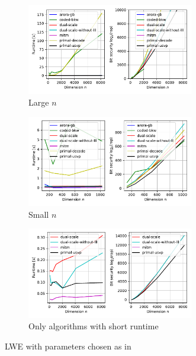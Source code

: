 \begin{figure}[h!]
    \centering
    \begin{subfigure}{1\textwidth}
        \centering
        \includegraphics[width=0.8\textwidth]{graphics/LWE_plot_Regev_long.pdf}
        \caption{Large $n$}
    \end{subfigure}
    \begin{subfigure}{1\textwidth}
        \centering
        \includegraphics[width=0.8\textwidth]{graphics/LWE_plot_Regev_long_small_n.pdf}
        \caption{Small $n$}
    \end{subfigure}
    \begin{subfigure}{1\textwidth}
        \centering
        \includegraphics[width=0.8\textwidth]{graphics/LWE_plot_Regev_short.pdf}
        \caption{Only algorithms with short runtime}
    \end{subfigure}
    \caption{LWE with parameters chosen as in \cite{Reg05}}\label{fig:LWE-Regev}
\end{figure}


